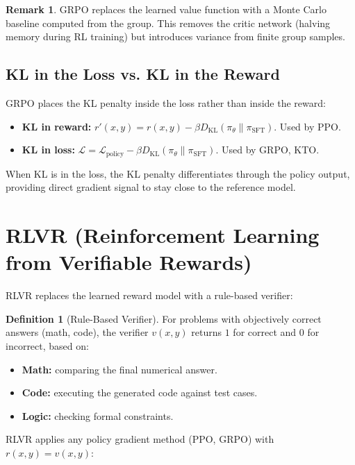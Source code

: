 \documentclass[11pt,a4paper]{book}
\theoremstyle{definition}
\newtheorem{definition}{Definition}[chapter]
\newtheorem{remark}{Remark}[chapter]
\begin{document}
\begin{remark}
	GRPO replaces the learned value function with a Monte Carlo baseline computed from the group. This removes the critic network (halving memory during RL training) but introduces variance from finite group samples.
\end{remark}

\subsection{KL in the Loss vs. KL in the Reward}

GRPO places the KL penalty inside the loss rather than inside the reward:
\begin{itemize}
	\item \textbf{KL in reward:} $r'(x,y) = r(x,y) - \beta D_{\mathrm{KL}}(\pi_\theta \parallel \pi_{\text{SFT}})$. Used by PPO.
	\item \textbf{KL in loss:} $\mathcal{L} = \mathcal{L}_{\text{policy}} - \beta D_{\mathrm{KL}}(\pi_\theta \parallel \pi_{\text{SFT}})$. Used by GRPO, KTO.
\end{itemize}

When KL is in the loss, the KL penalty differentiates through the policy output, providing direct gradient signal to stay close to the reference model.

\section{RLVR (Reinforcement Learning from Verifiable Rewards)}

RLVR replaces the learned reward model with a rule-based verifier:

\begin{definition}[Rule-Based Verifier]
	For problems with objectively correct answers (math, code), the verifier $v(x, y)$ returns $1$ for correct and $0$ for incorrect, based on:
	\begin{itemize}
		\item \textbf{Math:} comparing the final numerical answer.
		\item \textbf{Code:} executing the generated code against test cases.
		\item \textbf{Logic:} checking formal constraints.
	\end{itemize}
\end{definition}

RLVR applies any policy gradient method (PPO, GRPO) with $r(x,y) = v(x,y)$:
\end{document}
